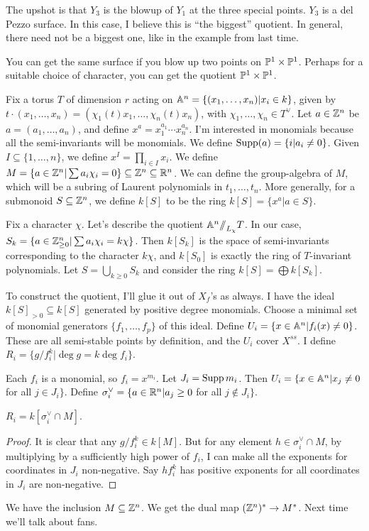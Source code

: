 \begin{example}
 The upshot is that $Y_3$ is the blowup of $Y_1$ at the three special points. $Y_3$ is a del Pezzo surface. In this case, I believe this is ``the biggest'' quotient. In general, there need not be a biggest one, like in the example from last time.
 
 You can get the same surface if you blow up two points on $\PP^1\times \PP^1$. Perhaps for a suitable choice of character, you can get the quotient $\PP^1\times\PP^1$.
\end{example}


Fix a torus $T$ of dimension $r$ acting on $\AA^n=\{(x_1,\dots, x_n)|x_i\in k\}$, given by $t\cdot (x_1,\dots, x_n)=(\chi_1(t)x_1,\dots, \chi_n(t)x_n)$, with $\chi_1,\dots, \chi_n\in T^\vee$. Let $a\in \ZZ^n$ be $a=(a_1,\dots, a_n)$, and define $x^a=x_1^{a_1}\cdots x_n^{a_n}$. I'm interested in monomials because all the semi-invariants will be monomials. We define $\supp(a)=\{i|a_i\neq 0\}$. Given $I\subseteq \{1,\dots, n\}$, we define $x^I=\prod_{i\in I}x_i$. We define $M=\{a\in \ZZ^n|\sum a_i\chi_i=0\}\subseteq \ZZ^n\subseteq \RR^n$. We can define the group-algebra of $M$, which will be a subring of Laurent polynomials in $t_1,\dots, t_n$. More generally, for a submonoid $S\subseteq \ZZ^n$, we define $k[S]$ to be the ring $k[S]=\{x^a|a\in S\}$.

Fix a character $\chi$. Let's describe the quotient $\AA^n\quot_{L_\chi}T$. In our case, $S_k=\{a\in\ZZ^n_{\ge 0}|\sum a_i\chi_i=k\chi\}$. Then $k[S_k]$ is the space of semi-invariants corresponding to the character $k\chi$, and $k[S_0]$ is exactly the ring of $T$-invariant polynomials. Let $S=\bigcup_{k\ge 0} S_k$ and consider the ring $k[S]=\bigoplus k[S_k]$.

To construct the quotient, I'll glue it out of $X_f$'s as always. I have the ideal $k[S]_{>0}\subseteq k[S]$ generated by positive degree monomials. Choose a minimal set of monomial generators $\{f_1,\dots, f_p\}$ of this ideal. Define $U_i=\{x\in \AA^n|f_i(x)\neq 0\}$. These are all semi-stable points by definition, and the $U_i$ cover $X^{ss}$. I define $R_i=\{g/f_i^k|\deg g=k\deg f_i\}$.

Each $f_i$ is a monomial, so $f_i=x^{m_i}$. Let $J_i=\supp m_i$. Then $U_i=\{x\in \AA^n|x_j\neq 0$ for all $j\in J_i\}$. Define $\sigma_i^\vee=\{a\in \RR^n|a_j\ge 0$ for all $j\not\in J_i\}$.
\begin{claim}
 $R_i=k[\sigma_i^\vee\cap M]$.
\end{claim}
\begin{proof}
 It is clear that any $g/f_i^k\in k[M]$. But for any element $h\in \sigma_i^\vee\cap M$, by multiplying by a sufficiently high power of $f_i$, I can make all the exponents for coordinates in $J_i$ non-negative. Say $hf_i^k$ has positive exponents for all coordinates in $J_i$ are non-negative.
\end{proof}
We have the inclusion $M\subseteq \ZZ^n$. We get the dual map $(\ZZ^n)^*\to M^*$. Next time we'll talk about fans.